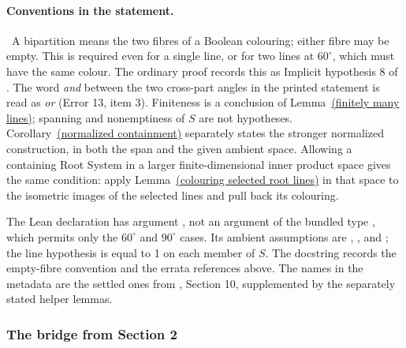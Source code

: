 \begin{mergedproofsection}
\paragraph{Conventions in the statement.}
\repair\ A bipartition means the two fibres of a Boolean colouring;
either fibre may be empty. This is required even for a single line,
or for two lines at $60^\circ$, which must have the same colour.
The ordinary proof records this as Implicit hypothesis 8 of
. The word \emph{and} between the two cross-part
angles in the printed statement is read as \emph{or} (Error 13, item 3).
Finiteness is a conclusion of Lemma~\hyperref[lem:312-finite]{(finitely many lines)};
spanning and nonemptiness of $S$ are not hypotheses.
Corollary~\hyperref[cor:312-containment]{(normalized containment)} separately states the stronger
normalized construction, in both the span and the given ambient space.
Allowing a containing Root System in a larger finite-dimensional inner
product space gives the same condition: apply
Lemma~\hyperref[lem:312-necessary]{(colouring selected root lines)} in that space to the isometric images
of the selected lines and pull back its colouring.

The Lean declaration has argument ,
not an argument of the bundled type , which permits
only the $60^\circ$ and $90^\circ$ cases. Its ambient assumptions are
, ,
and ; the line hypothesis is
 equal to 1 on each member of $S$.
The docstring records the empty-fibre convention and the
errata references above. The names in the metadata are the settled
ones from , Section 10, supplemented by the
separately stated helper lemmas.

\subsubsection{The bridge from Section 2}


\end{mergedproofsection}
